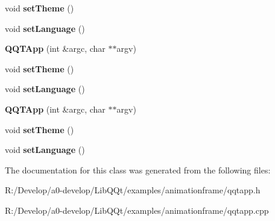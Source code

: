 \begin{DoxyCompactItemize}
void {\bfseries set\+Theme} ()
\item 
\mbox{\label{class_q_q_t_app_a15aa8fac4b702bdfb2ea3e244e256e5a}} 
void {\bfseries set\+Language} ()
\item 
\mbox{\label{class_q_q_t_app_a5de976120554dc989d743a9b57f1ba8b}} 
{\bfseries Q\+Q\+T\+App} (int \&argc, char $\ast$$\ast$argv)
\item 
\mbox{\label{class_q_q_t_app_a1edf09c269743d1fba20d26cb6479632}} 
void {\bfseries set\+Theme} ()
\item 
\mbox{\label{class_q_q_t_app_a15aa8fac4b702bdfb2ea3e244e256e5a}} 
void {\bfseries set\+Language} ()
\item 
\mbox{\label{class_q_q_t_app_a5de976120554dc989d743a9b57f1ba8b}} 
{\bfseries Q\+Q\+T\+App} (int \&argc, char $\ast$$\ast$argv)
\item 
\mbox{\label{class_q_q_t_app_a1edf09c269743d1fba20d26cb6479632}} 
void {\bfseries set\+Theme} ()
\item 
\mbox{\label{class_q_q_t_app_a15aa8fac4b702bdfb2ea3e244e256e5a}} 
void {\bfseries set\+Language} ()
\end{DoxyCompactItemize}


The documentation for this class was generated from the following files\+:\begin{DoxyCompactItemize}
\item 
R\+:/\+Develop/a0-\/develop/\+Lib\+Q\+Qt/examples/animationframe/qqtapp.\+h\item 
R\+:/\+Develop/a0-\/develop/\+Lib\+Q\+Qt/examples/animationframe/qqtapp.\+cpp\end{DoxyCompactItemize}
